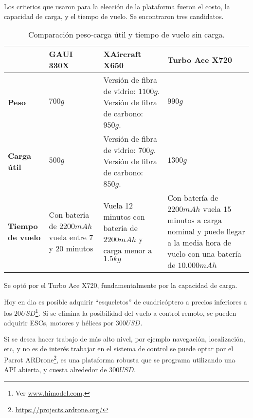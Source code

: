 \documentclass[main]{subfiles}
\begin{document}
Los criterios que usaron para la elección de la plataforma fueron el costo, la capacidad de carga, y el tiempo de vuelo. Se encontraron tres candidatos.

\begin{table}[H]
\begin{tabular}{p{40pt}|p{70pt}|p{160pt}|p{120pt}|} 
\cline{2-4}
& \cellcolor[gray]{0.8} \textbf{GAUI 330X} 
& \cellcolor[gray]{0.8} \textbf{XAircraft X650} 
& \cellcolor[gray]{0.8} \textbf{Turbo Ace X720} \\ \cline{2-4}
\hline
\multicolumn{1}{|p{40pt}|}{\cellcolor[gray]{0.8}\textbf{Peso}} 
& $700g$ & Versi\'on de fibra de vidrio: $1100g$. Versi\'on de fibra de carbono: $950g$. & $990g$ \\
\hline
\multicolumn{1}{|p{40pt}|}{\cellcolor[gray]{0.8}\textbf{Carga \'util}} 
& $500g$ & Versi\'on de fibra de vidrio: $700g$. Versi\'on de fibra de carbono: $850g$. & $1300 g$ \\ 
\hline 
\multicolumn{1}{|p{40pt}|}{\cellcolor[gray]{0.8}\textbf{Tiempo de vuelo}} 
& Con bater\'ia de $2200 mAh$ vuela entre 7 y 20 minutos & Vuela 12 minutos con bater\'ia de $2200mAh$ y carga menor a $1.5kg$ & Con bater\'ia de $2200mAh$ vuela 15 minutos a carga nominal y puede llegar a la media hora de vuelo con una bater\'ia de $10.000mAh$ \\
\hline
\end{tabular}
\caption{Comparaci\'on peso-carga \'util y tiempo de vuelo sin carga.}
\label{tab:peso}
\end{table}

Se optó por el Turbo Ace X720, fundamentalmente por la capacidad de carga.

Hoy en dia es posible adquirir ``esqueletos'' de cuadric\'optero a precios inferiores a los $20USD$\footnote{Ver \url{www.himodel.com}.}. Si se elimina la posibilidad del vuelo a control remoto, se pueden adquirir ESCs, motores y h\'elices por $300 USD$.

Si se desea hacer trabajo de más alto nivel, por ejemplo navegación, localización, etc, y no es de interés trabajar en el sistema de control se puede optar por el Parrot ARDrone\footnote{\url{https://projects.ardrone.org/}}, es una plataforma robusta que se programa utilizando una API abierta, y cuesta alrededor de $300 USD$.
\end{document}
